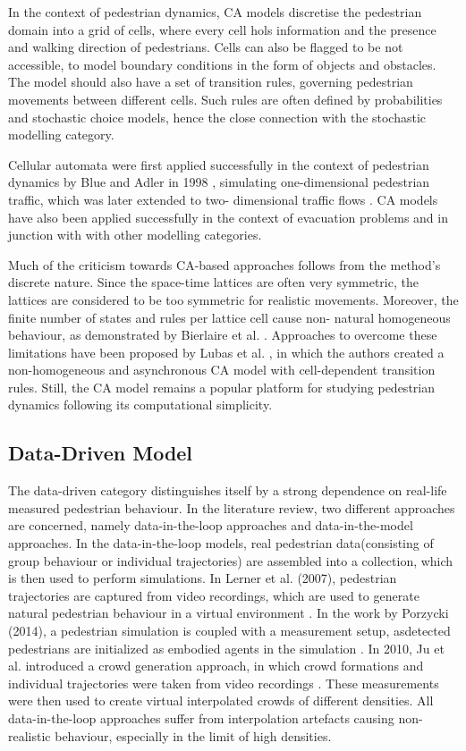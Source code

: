 \documentclass[class=article, crop=false]{standalone}
\begin{document}
In the context of pedestrian dynamics, CA models discretise the pedestrian domain into a grid of cells, where every cell hols information and the presence and walking direction of pedestrians. Cells can also be flagged to be not accessible, to model boundary conditions in the form of objects and obstacles. The model should also have a set of transition rules, governing pedestrian movements between different cells. Such rules are often defined by probabilities and stochastic choice models, hence the close connection with the stochastic modelling category.

Cellular automata were first applied successfully in the context of pedestrian dynamics by Blue and Adler in 1998 \cite{microsimulation_1}, simulating one-dimensional pedestrian traffic, which was later extended to two- dimensional traffic flows \cite{microsimulation_2}. CA models have also been applied successfully in the context of evacuation problems \cite{evacuation_1,evacuation_2} and in junction with with other modelling categories.

Much of the criticism towards CA-based approaches follows from the method’s discrete nature. Since the space-time lattices are often very symmetric, the lattices are considered to be too symmetric for realistic movements. Moreover, the finite number of states and rules per lattice cell cause non- natural homogeneous behaviour, as demonstrated by Bierlaire et al. \cite{criticism_1}. Approaches to overcome these limitations have been proposed by Lubas et al. \cite{criticism_2}, in which the authors created a non-homogeneous and asynchronous CA model with cell-dependent transition rules. Still, the CA model remains a popular platform for studying pedestrian dynamics following its computational simplicity.


\subsection{Data-Driven Model}
The data-driven category distinguishes itself by a strong dependence on real-life measured pedestrian behaviour. In the literature review, two different approaches are concerned, namely data-in-the-loop approaches and data-in-the-model approaches.
In the data-in-the-loop models, real pedestrian data(consisting of group behaviour or individual trajectories) are assembled into a collection, which is then used to perform simulations. In Lerner et al. (2007), pedestrian trajectories are captured from video recordings, which are used to generate natural pedestrian behaviour in a virtual environment \cite{crowds}. In the work by Porzycki (2014), a pedestrian simulation is coupled with a measurement setup, asdetected pedestrians are initialized as embodied agents in the simulation \cite{data_driven}. In 2010, Ju et al. introduced a crowd generation approach, in which crowd formations and individual trajectories were taken from video recordings \cite{mor_crowds}. These measurements were then used to create virtual interpolated crowds of different densities. All data-in-the-loop approaches suffer from interpolation artefacts causing non-realistic behaviour, especially in the limit of high densities.
\end{document}
